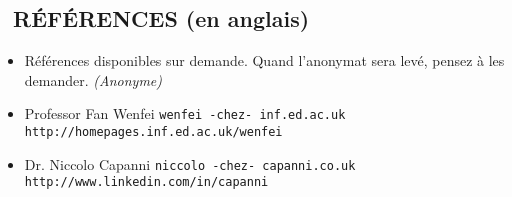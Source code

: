 \documentclass{res}
\begin{document}
\begin{resume}
\section{\faUserCheck~R\'EF\'ERENCES (en anglais)}
\ifisanon 
    \begin{itemize}
			\item[] R\'ef\'erences disponibles sur demande. Quand l'anonymat sera lev\'e, pensez \`a les demander. \textit{(Anonyme)}
    \end{itemize}
\else
		\begin{itemize}
			\item[] Professor Fan Wenfei \tabto{4cm} \texttt{wenfei -chez- inf.ed.ac.uk} \hfill \texttt{http://homepages.inf.ed.ac.uk/wenfei}
			\item[] Dr. Niccolo Capanni \tabto{4cm} \texttt{niccolo -chez- capanni.co.uk} \hfill \texttt{http://www.linkedin.com/in/capanni}
		\end{itemize}
\fi
\end{resume}
\end{document}
